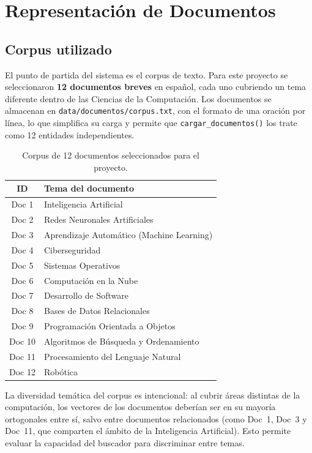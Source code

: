 \section{Representación de Documentos}

\subsection{Corpus utilizado}

El punto de partida del sistema es el corpus de texto. Para este proyecto se seleccionaron \textbf{12 documentos breves} en español, cada uno cubriendo un tema diferente dentro de las Ciencias de la Computación. Los documentos se almacenan en \texttt{data/documentos/corpus.txt}, con el formato de una oración por línea, lo que simplifica su carga y permite que \texttt{cargar\_documentos()} los trate como 12 entidades independientes.

\begin{table}[H]
\centering
\caption{Corpus de 12 documentos seleccionados para el proyecto.}
\label{tab:corpus}
\begin{tabular}{|c|l|}
\hline
\textbf{ID} & \textbf{Tema del documento} \\
\hline
Doc 1  & Inteligencia Artificial \\
Doc 2  & Redes Neuronales Artificiales \\
Doc 3  & Aprendizaje Automático (Machine Learning) \\
Doc 4  & Ciberseguridad \\
Doc 5  & Sistemas Operativos \\
Doc 6  & Computación en la Nube \\
Doc 7  & Desarrollo de Software \\
Doc 8  & Bases de Datos Relacionales \\
Doc 9  & Programación Orientada a Objetos \\
Doc 10 & Algoritmos de Búsqueda y Ordenamiento \\
Doc 11 & Procesamiento del Lenguaje Natural \\
Doc 12 & Robótica \\
\hline
\end{tabular}
\end{table}

La diversidad temática del corpus es intencional: al cubrir áreas distintas de la computación, los vectores de los documentos deberían ser en su mayoría ortogonales entre sí, salvo entre documentos relacionados (como Doc~1, Doc~3 y Doc~11, que comparten el ámbito de la Inteligencia Artificial). Esto permite evaluar la capacidad del buscador para discriminar entre temas.

